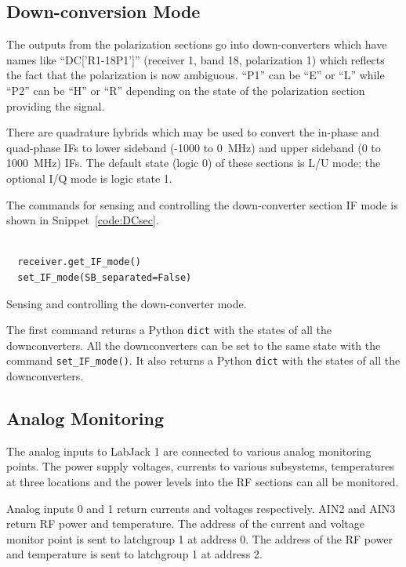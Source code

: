 \documentclass[letterpaper,11pt]{book}
\begin{document}
\subsection{Down-conversion Mode}

The outputs from the polarization sections go into down-converters which have
names like ``DC['R1-18P1']'' (receiver 1, band 18, polarization 1) which 
reflects the fact that the polarization is
now ambiguous. ``P1'' can be ``E'' or ``L'' while ``P2'' can be ``H'' or ``R''
depending on the state of the polarization section providing the signal.

There are quadrature hybrids which may be 
used to convert the
in-phase and quad-phase IFs to lower sideband (-1000 to 0~MHz) and upper 
sideband (0 to 1000~MHz) IFs.  The default state (logic 0) of these sections is
L/U mode; the optional I/Q mode is logic state 1.  

The commands for sensing and controlling the down-converter section IF mode is
shown in Snippet~\ref{code:DCsec}.
\begin{code}[h!tb]
\begin{center}
  \begin{verbatim}
  
  receiver.get_IF_mode()
  set_IF_mode(SB_separated=False)\end{verbatim}
\caption{\label{code:DCsec}Sensing and controlling the down-converter mode.}
\end{center}
\end{code}
The first command
returns a Python {\tt dict} with the states of all the downconverters.
All the downconverters can be set to the same state with the command
{\tt set\_IF\_mode()}.
It also returns a Python {\tt dict} with the states of all the downconverters.

\subsection{Analog Monitoring}

The analog inputs to LabJack 1 are connected to various analog monitoring
points.
The power supply voltages, currents to various subsystems, temperatures at
three locations and the power levels into the RF sections can all be monitored.

Analog inputs 0 and 1 return currents and voltages respectively. AIN2 and AIN3 
return RF power and temperature. The address of the current and voltage monitor
point is sent to latchgroup 1 at address 0.  The address of the RF power and
temperature is sent to latchgroup 1 at address 2.
\end{document}
